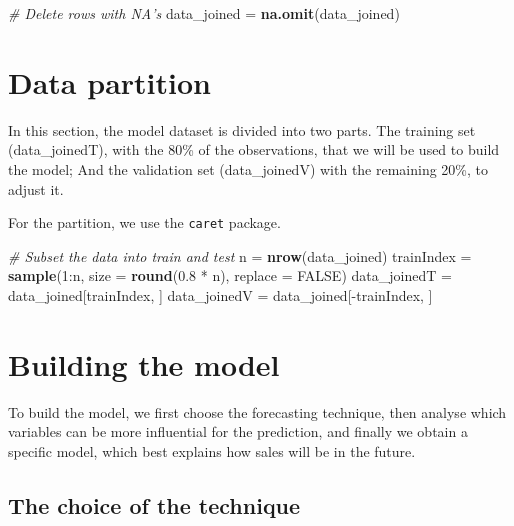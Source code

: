 \documentclass[11pt,]{article}
\newenvironment{Shaded}{\begin{snugshade}}{\end{snugshade}}
\newcommand{\KeywordTok}[1]{\textcolor[rgb]{0.13,0.29,0.53}{\textbf{{#1}}}}
\newcommand{\DataTypeTok}[1]{\textcolor[rgb]{0.13,0.29,0.53}{{#1}}}
\newcommand{\DecValTok}[1]{\textcolor[rgb]{0.00,0.00,0.81}{{#1}}}
\newcommand{\FloatTok}[1]{\textcolor[rgb]{0.00,0.00,0.81}{{#1}}}
\newcommand{\StringTok}[1]{\textcolor[rgb]{0.31,0.60,0.02}{{#1}}}
\newcommand{\CommentTok}[1]{\textcolor[rgb]{0.56,0.35,0.01}{\textit{{#1}}}}
\newcommand{\OtherTok}[1]{\textcolor[rgb]{0.56,0.35,0.01}{{#1}}}
\newcommand{\NormalTok}[1]{{#1}}
\begin{document}
\begin{Shaded}
\begin{Highlighting}[]
\CommentTok{# Delete rows with NA's}
\NormalTok{data_joined =}\StringTok{ }\KeywordTok{na.omit}\NormalTok{(data_joined)}
\end{Highlighting}
\end{Shaded}

\section{Data partition}\label{data-partition}

In this section, the model dataset is divided into two parts. The
training set (data\_joinedT), with the 80\% of the observations, that we
will be used to build the model; And the validation set (data\_joinedV)
with the remaining 20\%, to adjust it.

For the partition, we use the \texttt{caret} package.

\begin{Shaded}
\begin{Highlighting}[]
\CommentTok{# Subset the data into train and test}
\NormalTok{n =}\StringTok{ }\KeywordTok{nrow}\NormalTok{(data_joined)}
\NormalTok{trainIndex =}\StringTok{ }\KeywordTok{sample}\NormalTok{(}\DecValTok{1}\NormalTok{:n, }\DataTypeTok{size =} \KeywordTok{round}\NormalTok{(}\FloatTok{0.8} \NormalTok{*}\StringTok{ }\NormalTok{n), }\DataTypeTok{replace =} \OtherTok{FALSE}\NormalTok{)}
\NormalTok{data_joinedT =}\StringTok{ }\NormalTok{data_joined[trainIndex, ]}
\NormalTok{data_joinedV =}\StringTok{ }\NormalTok{data_joined[-trainIndex, ]}
\end{Highlighting}
\end{Shaded}

\section{Building the model}\label{building-the-model}

To build the model, we first choose the forecasting technique, then
analyse which variables can be more influential for the prediction, and
finally we obtain a specific model, which best explains how sales will
be in the future.

\subsection{The choice of the
technique}\label{the-choice-of-the-technique}
\end{document}

